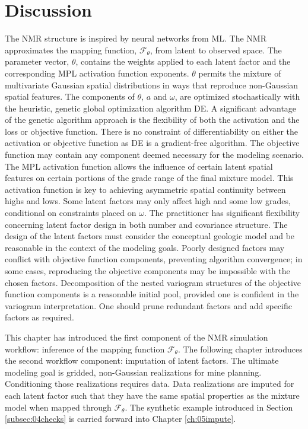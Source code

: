 \FloatBarrier
\section{Discussion}
\label{sec:04discuss}

The \gls{NMR} structure is inspired by neural networks from \gls{ML}. The \gls{NMR} approximates the mapping function, $\mathcal{F}_{\theta}$, from latent to observed space. The parameter vector, $\theta$, contains the weights applied to each latent factor and the corresponding \gls{MPL} activation function exponents. $\theta$ permits the mixture of multivariate Gaussian spatial distributions in ways that reproduce non-Gaussian spatial features. The components of $\theta$, $a$ and $\omega$, are optimized stochastically with the heuristic, genetic global optimization algorithm \gls{DE}. A significant advantage of the genetic algorithm approach is the flexibility of both the activation and the loss or objective function. There is no constraint of differentiability on either the activation or objective function as \Gls{DE} is a gradient-free algorithm. The objective function may contain any component deemed necessary for the modeling scenario. The \gls{MPL} activation function allows the influence of certain latent spatial features on certain portions of the grade range of the final mixture model. This activation function is key to achieving asymmetric spatial continuity between highs and lows. Some latent factors may only affect high and some low grades, conditional on constraints placed on $\omega$. The practitioner has significant flexibility concerning latent factor design in both number and covariance structure. The design of the latent factors must consider the conceptual geologic model and be reasonable in the context of the modeling goals. Poorly designed factors may conflict with objective function components, preventing algorithm convergence; in some cases, reproducing the objective components may be impossible with the chosen factors. Decomposition of the nested variogram structures of the objective function components is a reasonable initial pool, provided one is confident in the variogram interpretation. One should prune redundant factors and add specific factors as required.

This chapter has introduced the first component of the \gls{NMR} simulation workflow: inference of the mapping function $\mathcal{F}_{\theta}$. The following chapter introduces the second workflow component: imputation of latent factors. The ultimate modeling goal is gridded, non-Gaussian realizations for mine planning. Conditioning those realizations requires data. Data realizations are imputed for each latent factor such that they have the same spatial properties as the mixture model when mapped through $\mathcal{F}_{\theta}$. The synthetic example introduced in Section \ref{subsec:04checks} is carried forward into Chapter \ref{ch:05impute}.